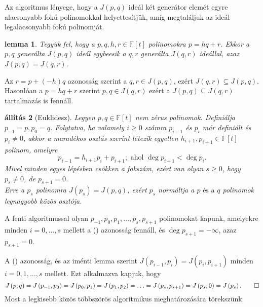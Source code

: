 \documentclass[a4paper, showtrims]{memoir}
\makeatletter
\renewenvironment{proof}[1][\proofname]
    {\par\pushQED{\qed}%
    \normalfont \topsep6\p@\@plus6\p@\relax
    \trivlist
    \item[\hskip\labelsep
        \itshape
    #1\@addpunct{:}]\ignorespaces}
    {\popQED\endtrivlist\@endpefalse}
\theoremstyle{plain}
\newtheorem{proposition}{állítás}[chapter]
\newtheorem{lemma}[proposition]{lemma}
\theoremstyle{remark}
\theoremstyle{definition}
\makeatother
\begin{document}
Az algoritmus lényege, hogy a $J\left( p,q \right)$ ideál két generátor elemét egyre alacsonyabb fokú
polinomokkal helyettesítjük, amíg megtaláljuk az ideál legalacsonyabb fokú polinomját.
\begin{lemma}
    Tegyük fel, hogy a $p,q,h,r\in\mathbb{F}[t]$ polinomokra
    \(
    p=hq+r
    \).
    Ekkor a $p,q$ generálta $J\left( p,q \right)$ ideál egybeesik a $q,r$ generálta $J\left( q,r \right)$ ideállal, azaz $J\left( p,q \right)=J\left( q,r \right)$.
\end{lemma}
\begin{proof}
    Az $r=p+(-h)q$ azonosság szerint a $q,r\in J\left( p,q \right)$, 
    ezért $J\left( q,r \right)\subseteq J\left( p,q \right)$.
    Hasonlóan a $p=hq+r$ szerint $p,q\in J\left( q,r \right)$ ezért a 
    $J\left( p,q \right)\subseteq J\left( q,r \right)$
    tartalmazás is fennáll.
\end{proof}
\begin{proposition}[Euklidesz]
	Legyen $p,q\in\mathbb{F}\left[ t \right]$ nem zérus polinomok.
	Definiálja $p_{-1}=p,p_{0}=q$.
	Folytatva, ha valamely $i\geq 0$ számra $p_{i-1}$ és $p_i$ már definiált és $p_i\neq 0$,
	akkor a maradékos osztás szerint létezik egyetlen $h_{i+1},p_{i+1}\in\mathbb{F}\left[ t \right]$ polinom,
	amelyre
	\[
		p_{i-1}=h_{i+1}p_i+p_{i+1};
		\text{ ahol }
		\deg p_{i+1}<\deg p_i.\tag{\dag}
	\]
	Mivel minden egyes lépésben csökken a fokszám,
	ezért van olyan $s\geq 0$,
	hogy $p_s\neq 0$, de $p_{s+1}=0$.
	\\
	Erre a $p_s$ polinomra $J\left( p_s \right)=J\left( p,q \right)$, ezért
	$p_s$ normáltja a $p\text{ és a }q$ polinomok legnagyobb közös osztója.
\end{proposition}
\begin{proof}
	A fenti algoritmussal olyan
	$p_{-1}, p_0,p_1,\ldots,p_s,p_{s+1}$ polinomokat kapunk,
	amelyekre minden $i=0,\ldots,s$ mellett a (\dag) azonosság fennáll,
	és $\deg p_{s+1}=-\infty$,
	azaz $p_{s+1}=0$.

	A (\dag) azonosság, és az iménti lemma szerint
	\(
		J\left( p_{i-1},p_i \right)
		=
		J\left( p_i,p_{i+1} \right)
	\)
	minden $i=0,1,\ldots,s$ mellett.
	Ezt alkalmazva kapjuk, hogy
	\[
		J\left( p,q \right)
		=
		J\left( p_{-1},p_0 \right)
		=
		J\left( p_0,p_1 \right)
		=
		J\left( p_1,p_2 \right)
		=\ldots=
		J\left( p_s,p_{s+1} \right)
		=J\left( p_s, 0\right)
		=J\left( p_s \right).\qedhere
	\]
\end{proof}
Most a legkisebb közös többszörös algoritmikus meghatározására törekszünk.
\end{document}
